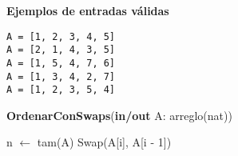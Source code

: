 \textbf{Ejemplos de entradas válidas}

\begin{lstlisting}
A = [1, 2, 3, 4, 5]
A = [2, 1, 4, 3, 5]
A = [1, 5, 4, 7, 6]
A = [1, 3, 4, 2, 7]
A = [1, 2, 3, 5, 4]
\end{lstlisting}

\begin{algorithm}[H]
\caption{
    \textbf{OrdenarConSwaps}(\textbf{in/out} A: arreglo(nat))
}
\begin{algorithmic}[1]
    \State n $\gets$ tam(A)
     
            \State Swap(A[i], A[i - 1])
        \EndIf
    \EndFor
\end{algorithmic}
\end{algorithm}
